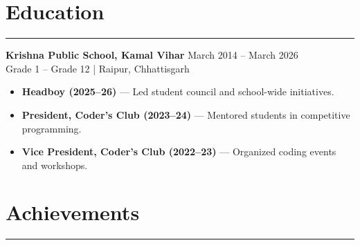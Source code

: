 \documentclass[11pt,a4paper]{article}
\newcommand{\resumesection}[1]{
  \section*{#1}
  \vspace{-4pt}
  \hrule
  \vspace{5pt}
}
\begin{document}
\resumesection{Education}
\textbf{Krishna Public School, Kamal Vihar} \hfill March 2014 -- March 2026\\[-2pt]
Grade 1 -- Grade 12 \;|\; Raipur, Chhattisgarh

\begin{itemize}
\item \textbf{Headboy (2025–26)} — Led student council and school-wide initiatives.
\item \textbf{President, Coder’s Club (2023–24)} — Mentored students in competitive programming.
\item \textbf{Vice President, Coder’s Club (2022–23)} — Organized coding events and workshops.
\end{itemize}

\resumesection{Achievements}
\end{document}
